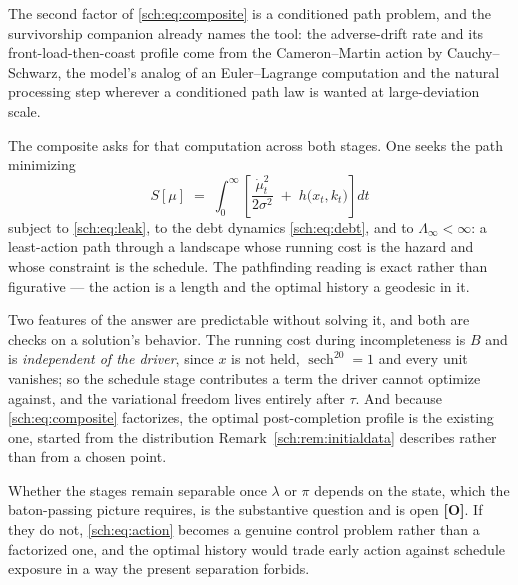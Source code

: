 \begin{remark}
\label{sch:rem:variational}
The second factor of \eqref{sch:eq:composite} is a conditioned path
problem, and the survivorship companion \cite{GoldenSurvivorship} already names the tool: the
adverse-drift rate and its front-load-then-coast profile come from the
Cameron--Martin action by Cauchy--Schwarz, the model's analog of an
Euler--Lagrange computation and the natural processing step wherever a
conditioned path law is wanted at large-deviation scale.

The composite asks for that computation across both stages. One seeks
the path minimizing
\begin{equation}\label{sch:eq:action}
S[\mu]\;=\;\int_0^{\infty}\left[\frac{\dot\mu_t^{2}}{2\sigma^{2}}
\;+\;h\bigl(x_t,k_t\bigr)\right]dt
\end{equation}
subject to \eqref{sch:eq:leak}, to the debt dynamics
\eqref{sch:eq:debt}, and to $\Lambda_\infty<\infty$: a least-action path
through a landscape whose running cost is the hazard and whose
constraint is the schedule. The pathfinding reading is exact rather than
figurative --- the action is a length and the optimal history a geodesic
in it.

Two features of the answer are predictable without solving it, and both
are checks on a solution's behavior. The running cost during
incompleteness is $B$ and is \emph{independent of the driver}, since $x$
is not held, $\operatorname{sech}^20=1$ and every unit vanishes; so the schedule stage contributes a
term the driver cannot optimize against, and the variational freedom
lives entirely after $\tau$. And because \eqref{sch:eq:composite}
factorizes, the optimal post-completion profile is the existing one,
started from the distribution Remark~\ref{sch:rem:initialdata}
describes rather than from a chosen point.

Whether the stages remain separable once $\lambda$ or $\pi$ depends on
the state, which the baton-passing picture requires, is the
substantive question and is open \textbf{[O]}. If they do not,
\eqref{sch:eq:action} becomes a genuine control problem rather than a
factorized one, and the optimal history would trade early action against
schedule exposure in a way the present separation forbids.
\end{remark}

